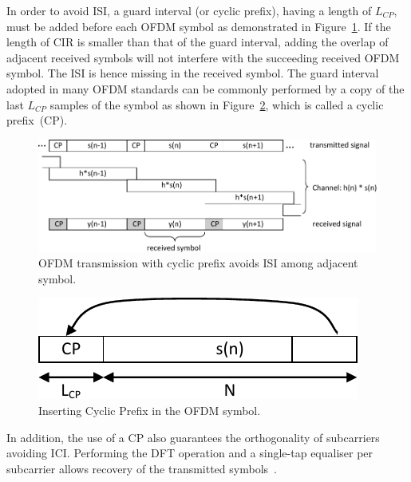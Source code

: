 In order to avoid ISI, a guard interval (or cyclic prefix), having a length of $L_{CP}$, must be added before each OFDM symbol as demonstrated in Figure~\ref{fig:CIR-CP}.
If the length of CIR is smaller than that of the guard interval, adding the overlap of adjacent received symbols will not interfere with the succeeding received OFDM symbol.
The ISI is hence missing in the received symbol.
The guard interval adopted in many OFDM standards can be commonly performed by a copy of the last $L_{CP}$ samples of the symbol as shown in Figure~\ref{fig:CP}, which is called a cyclic prefix~(CP).

\begin{figure}
	\centerline{\includegraphics [width=0.8\columnwidth] {Figures/CIR_CP.pdf} }
	\caption{OFDM transmission with cyclic prefix avoids ISI among adjacent symbol.}
	\label{fig:CIR-CP}
\end{figure}

\begin{figure}
	\centerline{\includegraphics [width=0.4\columnwidth] {Figures/CP.pdf} }
	\caption{Inserting Cyclic Prefix in the OFDM symbol.}
	\label{fig:CP}
\end{figure}

In addition, the use of a CP also guarantees the orthogonality of subcarriers avoiding ICI. Performing the DFT operation and a single-tap equaliser per subcarrier allows recovery of the transmitted symbols~\cite{farhang2008signal}.

